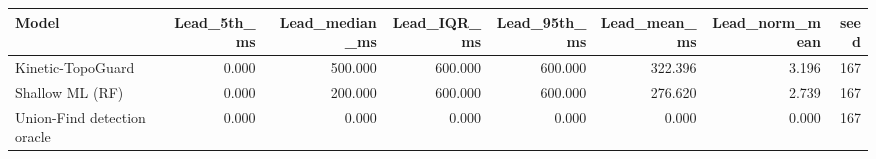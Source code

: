 \begin{tabular}{lrrrrrrr}
\toprule
Model & Lead\_5th\_ms & Lead\_median\_ms & Lead\_IQR\_ms & Lead\_95th\_ms & Lead\_mean\_ms & Lead\_norm\_mean & seed \\
\midrule
Kinetic-TopoGuard & 0.000 & 500.000 & 600.000 & 600.000 & 322.396 & 3.196 & 167 \\
Shallow ML (RF) & 0.000 & 200.000 & 600.000 & 600.000 & 276.620 & 2.739 & 167 \\
Union-Find detection oracle & 0.000 & 0.000 & 0.000 & 0.000 & 0.000 & 0.000 & 167 \\
\bottomrule
\end{tabular}